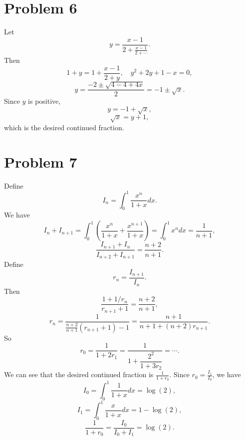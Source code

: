 \documentclass{article}
\newcommand{\bigp}[1]{\left(#1\right)}
\begin{document}
\section*{Problem 6}
Let
$$y = \frac{x - 1}{2 + \frac{x - 1}{2 + \cdots}}.$$
Then
$$1 + y = 1 + \frac{x - 1}{2 + y}, \quad y^2 + 2y + 1 - x = 0,$$
$$y = \frac{-2 \pm \sqrt{4 - 4 + 4x}}{2} = -1 \pm \sqrt{x}.$$
Since $y$ is positive,
$$y = -1 + \sqrt{x},$$
$$\sqrt{x} = y + 1,$$
which is the desired continued fraction.

\section*{Problem 7}
Define
$$I_n = \int_0^1 \frac{x^n}{1 + x}dx.$$
We have
$$I_n + I_{n + 1} = \int_0^1 \bigp{\frac{x^n}{1 + x} + \frac{x^{n + 1}}{1 + x}} = \int_0^1 x^n dx = \frac{1}{n + 1},$$
$$\frac{I_{n + 1} + I_n}{I_{n + 2} + I_{n + 1}} = \frac{n + 2}{n + 1}.$$
Define
$$r_n = \frac{I_{n + 1}}{I_n}.$$
Then
$$\frac{1 + 1/r_n}{r_{n + 1} + 1} = \frac{n + 2}{n + 1},$$
$$r_n = \frac{1}{\frac{n + 2}{n + 1}(r_{n + 1} + 1) - 1} = \frac{n + 1}{n + 1 + (n + 2)r_{n + 1}}.$$
So
$$r_0 = \frac{1}{1 + 2r_1} = \frac{1}{1 + \dfrac{2^2}{1 + 3r_2}} = \cdots.$$
We can see that the desired continued fraction is $\frac{1}{1 + r_0}$. Since $r_0 = \frac{I_1}{I_0}$, we have
$$I_0 = \int_0^1 \frac{1}{1 + x}dx = \log(2),$$
$$I_1 = \int_0^1 \frac{x}{1 + x}dx = 1 - \log(2),$$
$$\frac{1}{1 + r_0} = \frac{I_0}{I_0 + I_1} = \log(2).$$
\end{document}

